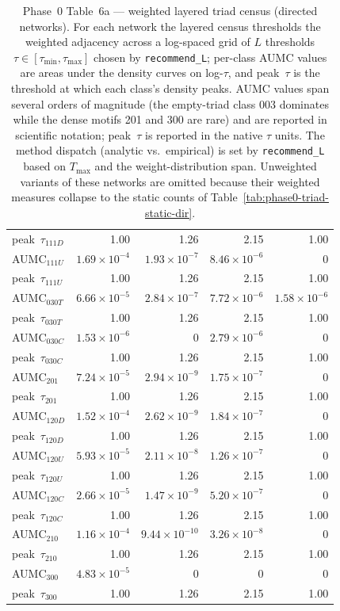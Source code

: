 \documentclass[11pt]{article}
\begin{document}
\begin{table}[!htbp]
\begin{tabular}{l r r | r r}
peak~$\tau_{111D}$ & 1.00 & 1.26 & 2.15 & 1.00 \\
AUMC$_{111U}$    & $1.69\times10^{-4}$ & $1.93\times10^{-7}$ & $8.46\times10^{-6}$ & 0 \\
peak~$\tau_{111U}$ & 1.00 & 1.26 & 2.15 & 1.00 \\
AUMC$_{030T}$    & $6.66\times10^{-5}$ & $2.84\times10^{-7}$ & $7.72\times10^{-6}$ & $1.58\times10^{-6}$ \\
peak~$\tau_{030T}$ & 1.00 & 1.26 & 2.15 & 1.00 \\
AUMC$_{030C}$    & $1.53\times10^{-6}$ & 0 & $2.79\times10^{-6}$ & 0 \\
peak~$\tau_{030C}$ & 1.00 & 1.26 & 2.15 & 1.00 \\
AUMC$_{201}$    & $7.24\times10^{-5}$ & $2.94\times10^{-9}$ & $1.75\times10^{-7}$ & 0 \\
peak~$\tau_{201}$ & 1.00 & 1.26 & 2.15 & 1.00 \\
AUMC$_{120D}$    & $1.52\times10^{-4}$ & $2.62\times10^{-9}$ & $1.84\times10^{-7}$ & 0 \\
peak~$\tau_{120D}$ & 1.00 & 1.26 & 2.15 & 1.00 \\
AUMC$_{120U}$    & $5.93\times10^{-5}$ & $2.11\times10^{-8}$ & $1.26\times10^{-7}$ & 0 \\
peak~$\tau_{120U}$ & 1.00 & 1.26 & 2.15 & 1.00 \\
AUMC$_{120C}$    & $2.66\times10^{-5}$ & $1.47\times10^{-9}$ & $5.20\times10^{-7}$ & 0 \\
peak~$\tau_{120C}$ & 1.00 & 1.26 & 2.15 & 1.00 \\
AUMC$_{210}$    & $1.16\times10^{-4}$ & $9.44\times10^{-10}$ & $3.26\times10^{-8}$ & 0 \\
peak~$\tau_{210}$ & 1.00 & 1.26 & 2.15 & 1.00 \\
AUMC$_{300}$    & $4.83\times10^{-5}$ & 0 & 0 & 0 \\
peak~$\tau_{300}$ & 1.00 & 1.26 & 2.15 & 1.00 \\
\bottomrule
\end{tabular}
\caption{Phase~0 Table~6a --- weighted layered triad census (directed networks). For each network the layered census thresholds the weighted adjacency across a log-spaced grid of $L$ thresholds $\tau \in [\tau_{\min}, \tau_{\max}]$ chosen by \texttt{recommend\_L}; per-class AUMC values are areas under the density curves on log-$\tau$, and peak~$\tau$ is the threshold at which each class's density peaks. AUMC values span several orders of magnitude (the empty-triad class 003 dominates while the dense motifs 201 and 300 are rare) and are reported in scientific notation; peak~$\tau$ is reported in the native $\tau$ units. The method dispatch (analytic vs.\ empirical) is set by \texttt{recommend\_L} based on $T_{\max}$ and the weight-distribution span. Unweighted variants of these networks are omitted because their weighted measures collapse to the static counts of Table~\ref{tab:phase0-triad-static-dir}.}
\label{tab:phase0-triad-weighted-dir}
\end{table}
\end{document}
